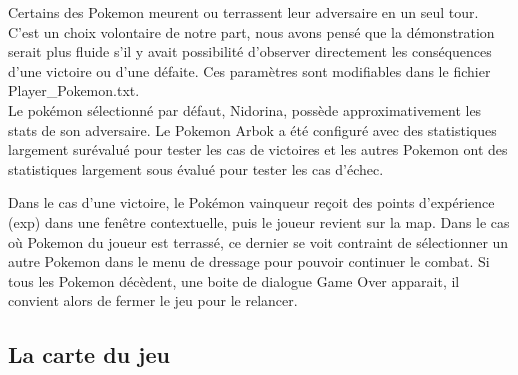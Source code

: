 \documentclass[a4paper,twoside, openany,11pt]{book}
\begin{document}
Certains des Pokemon meurent ou terrassent leur adversaire en un seul tour. C'est un choix volontaire de notre part, nous avons pensé que la démonstration serait plus fluide s'il y avait possibilité d'observer directement les conséquences d'une victoire ou d'une défaite. Ces paramètres sont modifiables dans le fichier Player\_Pokemon.txt.\\

Le pokémon sélectionné par défaut, Nidorina, possède approximativement les stats de son adversaire. Le Pokemon Arbok a été configuré avec des statistiques largement surévalué pour tester les cas de victoires et les autres Pokemon ont des statistiques largement sous évalué pour tester les cas d'échec.  

Dans le cas d'une victoire, le Pokémon vainqueur reçoit des points d'expérience (exp) dans une fenêtre contextuelle, puis le joueur revient sur la map. Dans le cas où Pokemon du joueur est terrassé, ce dernier se voit contraint de sélectionner un autre Pokemon dans le menu de dressage pour pouvoir continuer le combat. Si tous les Pokemon décèdent, une boite de dialogue Game Over apparait, il convient alors de fermer le jeu pour le relancer.

\subsection{La carte du jeu}
\end{document}
